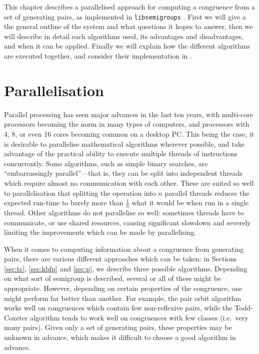 This chapter describes a parallelised approach for computing a congruence from a
set of generating pairs, as implemented in \texttt{libsemigroups}
\cite{libsemigroups}.  First we will give a the general outline of the system
and what questions it hopes to answer, then we will describe in detail each
algorithms used, its advantages and disadvantages, and when it can be applied.
Finally we will explain how the different algorithms are executed together, and
consider their implementation in \cite{libsemigroups}.

\section{Parallelisation}

Parallel processing has seen major advances in the last ten years, with
multi-core processors becoming the norm in many types of computers, and
processors with 4, 8, or even 16 cores becoming common on a desktop PC.  This
being the case, it is desirable to parallelise mathematical algorithms wherever
possible, and take advantage of the practical ability to execute multiple
threads of instructions concurrently.  Some algorithms, such as simple binary
searches, are ``embarrassingly parallel''---that is, they can be split into
independent threads which require almost no communication with each other.
These are suited so well to parallelisation that splitting the operation into
$n$ parallel threads reduces the expected run-time to barely more than
$\frac{1}{n}$ what it would be when run in a single thread.  Other
algorithms do not parallelise so well: sometimes threads have to communicate, or
use shared resources, causing significant slowdown and severely limiting the
improvements which can be made by parallelising.

When it comes to computing information about a congruence from generating pairs,
there are various different approaches which can be taken: in Sections
\ref{sec:tc}, \ref{sec:kbfp} and \ref{sec:p}, we describe three
possible algorithms.  Depending on what sort of semigroup is described, several
or all of these might be appropriate.  However, depending on certain properties
of the congruence, one might perform far better than another.  For example, the
pair orbit algorithm works well on congruences which contain few non-reflexive
pairs, while the Todd-Coxeter algorithm tends to work well on congruences with
few classes (i.e.~very many pairs).  Given only a set of generating pairs, these
properties may be unknown in advance, which makes it difficult to choose a good
algorithm in advance.

